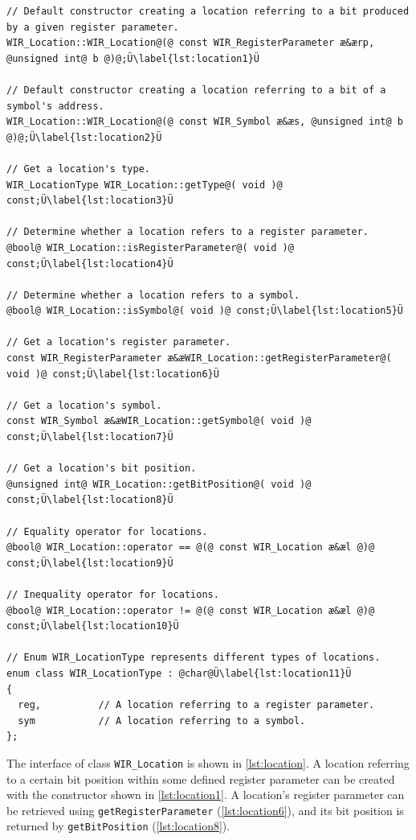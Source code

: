 \begin{lstlisting}[style=code,float=!b,caption={Location Handling by Class \texttt{WIR\_Location}},label=lst:location]
// Default constructor creating a location referring to a bit produced by a given register parameter.
WIR_Location::WIR_Location@(@ const WIR_RegisterParameter æ&ærp, @unsigned int@ b @)@;Ü\label{lst:location1}Ü

// Default constructor creating a location referring to a bit of a symbol's address.
WIR_Location::WIR_Location@(@ const WIR_Symbol æ&æs, @unsigned int@ b @)@;Ü\label{lst:location2}Ü

// Get a location's type.
WIR_LocationType WIR_Location::getType@( void )@ const;Ü\label{lst:location3}Ü

// Determine whether a location refers to a register parameter.
@bool@ WIR_Location::isRegisterParameter@( void )@ const;Ü\label{lst:location4}Ü

// Determine whether a location refers to a symbol.
@bool@ WIR_Location::isSymbol@( void )@ const;Ü\label{lst:location5}Ü

// Get a location's register parameter.
const WIR_RegisterParameter æ&æWIR_Location::getRegisterParameter@( void )@ const;Ü\label{lst:location6}Ü

// Get a location's symbol.
const WIR_Symbol æ&æWIR_Location::getSymbol@( void )@ const;Ü\label{lst:location7}Ü

// Get a location's bit position.
@unsigned int@ WIR_Location::getBitPosition@( void )@ const;Ü\label{lst:location8}Ü

// Equality operator for locations.
@bool@ WIR_Location::operator == @(@ const WIR_Location æ&æl @)@ const;Ü\label{lst:location9}Ü

// Inequality operator for locations.
@bool@ WIR_Location::operator != @(@ const WIR_Location æ&æl @)@ const;Ü\label{lst:location10}Ü

// Enum WIR_LocationType represents different types of locations.
enum class WIR_LocationType : @char@Ü\label{lst:location11}Ü
{
  reg,          // A location referring to a register parameter.
  sym           // A location referring to a symbol.
};
\end{lstlisting}

The interface of class \texttt{WIR\_Location} is shown in \cref{lst:location}.
A location referring to a certain bit position within some defined register parameter can be created with the constructor shown in \cref{lst:location1}.
A location's register parameter can be retrieved using \texttt{getRegisterParameter} (\cref{lst:location6}), and its bit position is returned by \texttt{getBitPosition} (\cref{lst:location8}).

